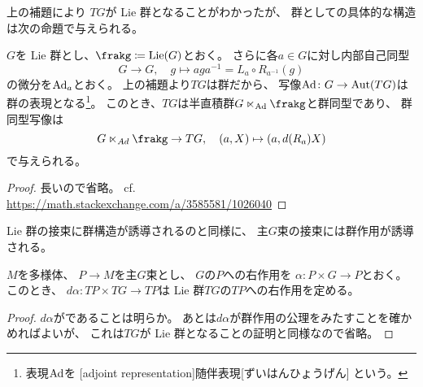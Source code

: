 \documentclass[report]{jlreq}
\begin{document}
上の補題により
$TG$が Lie 群となることがわかったが、
群としての具体的な構造は次の命題で与えられる。

\begin{proposition}[$TG$の群構造]
    $G$を Lie 群とし、$\frakg \coloneqq \Lie(G)$とおく。
    さらに各$a \in G$に対し内部自己同型
    \begin{equation}
        G \to G,
        \quad
        g \mapsto a g a^{-1}
        = L_a \circ R_{a^{-1}} (g)
    \end{equation}
    の微分を$\operatorname{Ad}_a$とおく。
    上の補題より$TG$は群だから、
    写像$\operatorname{Ad} \colon G \to \operatorname{Aut}(TG)$は群の表現となる\footnote{
        表現$\operatorname{Ad}$を
        [adjoint representation]{随伴表現}[ずいはんひょうげん]
        という。
    }。
    このとき、$TG$は半直積群$G \ltimes_{\Ad} \frakg$と群同型であり、
    群同型写像は
    \begin{equation}
        G \ltimes_{Ad} \frakg \to TG,
        \quad
        (a, X) \mapsto (a, d(R_a) X)
    \end{equation}
    で与えられる。
\end{proposition}

\begin{proof}
    長いので省略。
    cf. \url{https://math.stackexchange.com/a/3585581/1026040}
\end{proof}

Lie 群の接束に群構造が誘導されるのと同様に、
主$G$束の接束には群作用が誘導される。

\begin{lemma}
    $M$を多様体、
    $P \to M$を主$G$束とし、
    $G$の$P$への{\smooth}右作用を
    $\alpha \colon P \times G \to P$とおく。
    このとき、
    $d\alpha \colon TP \times TG \to TP$は
    Lie 群$TG$の$TP$への{\smooth}右作用を定める。
\end{lemma}

\begin{proof}
    $d\alpha$が{\smooth}であることは明らか。
    あとは$d\alpha$が群作用の公理をみたすことを確かめればよいが、
    これは$TG$が Lie 群となることの証明と同様なので省略。
\end{proof}


%
\end{document}

